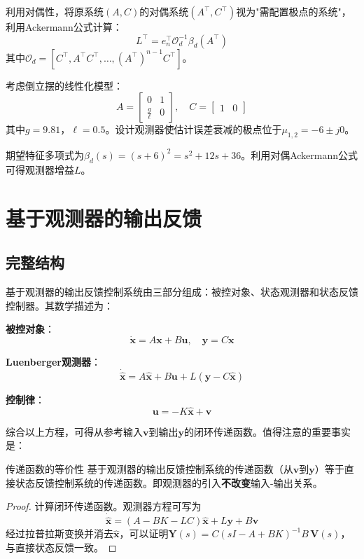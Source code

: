利用对偶性，将原系统$(A, C)$的对偶系统$(A^{\top}, C^{\top})$视为"需配置极点的系统"，利用Ackermann公式计算：
\[
L^{\top} = e_n^{\top} \mathcal{O}_d^{-1} \beta_d(A^{\top})
\]
其中$\mathcal{O}_d = [C^{\top}, A^{\top}C^{\top}, \dots, (A^{\top})^{n-1}C^{\top}]$。

\begin{example}[倒立摆的状态观测器]
考虑倒立摆的线性化模型：
\[
A = \begin{bmatrix} 0 & 1 \\ \frac{g}{\ell} & 0 \end{bmatrix},\quad
C = \begin{bmatrix} 1 & 0 \end{bmatrix}
\]
其中$g = 9.81$，$\ell = 0.5$。设计观测器使估计误差衰减的极点位于$\mu_{1,2} = -6 \pm j0$。

期望特征多项式为$\beta_d(s) = (s+6)^2 = s^2 + 12s + 36$。利用对偶Ackermann公式可得观测器增益$L$。
\end{example}

\section{基于观测器的输出反馈}

\subsection{完整结构}

基于观测器的输出反馈控制系统由三部分组成：被控对象、状态观测器和状态反馈控制器。其数学描述为：

\textbf{被控对象}：
\[
\dot{\mathbf{x}} = A\mathbf{x} + B\mathbf{u},\quad \mathbf{y} = C\mathbf{x}
\]

\textbf{Luenberger观测器}：
\[
\dot{\hat{\mathbf{x}}} = A\hat{\mathbf{x}} + B\mathbf{u} + L(\mathbf{y} - C\hat{\mathbf{x}})
\]

\textbf{控制律}：
\[
\mathbf{u} = -K\hat{\mathbf{x}} + \mathbf{v}
\]

综合以上方程，可得从参考输入$\mathbf{v}$到输出$\mathbf{y}$的闭环传递函数。值得注意的重要事实是：

\begin{myTheorem}{传递函数的等价性}
基于观测器的输出反馈控制系统的传递函数（从$\mathbf{v}$到$\mathbf{y}$）等于直接状态反馈控制系统的传递函数。即观测器的引入\textbf{不改变}输入-输出关系。
\end{myTheorem}

\begin{proof}
计算闭环传递函数。观测器方程可写为
\[
\dot{\hat{\mathbf{x}}} = (A - BK - LC)\hat{\mathbf{x}} + L\mathbf{y} + B\mathbf{v}
\]
经过拉普拉斯变换并消去$\hat{\mathbf{x}}$，可以证明$\mathbf{Y}(s) = C(sI - A + BK)^{-1}B\,\mathbf{V}(s)$，与直接状态反馈一致。
\end{proof}

